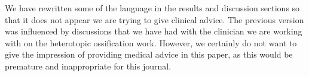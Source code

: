 \documentclass{report}
\begin{document}
We have rewritten some of the language in the results and discussion sections so that it does not appear we are trying to give clinical advice.  The previous version was influenced by discussions that we have had with the clinician we are working with on the heterotopic ossification work.  However, we certainly do not want to give the impression of providing medical advice in this paper, as this would be premature and inappropriate for this journal.  
\end{document}
